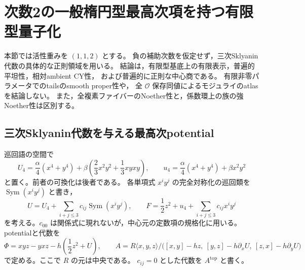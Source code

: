 \section{次数2の一般楕円型最高次項を持つ有限型量子化}
\label{sec:elliptic-degree-two-finite}

本節では活性重みを $(1,1,2)$ とする。
負の補助次数を仮定せず，三次Sklyanin代数の具体的な正則領域を用いる。
結論は，有限型基底上の有限表示，普遍的平坦性，相対ambient CY性，
および普遍的に正則な中心商である。
有限非零パラメータでのtailsのsmooth proper性や，
全 $\mathcal O$ 保存同値によるモジュライのatlasを結論しない。
また，全複素ファイバーのNoether性と，係数環上の族の強Noether性は区別する。

\subsection{三次Sklyanin代数を与える最高次potential}

巡回語の空間で
\[
 U_4=\frac{\alpha}{4}(x^4+y^4)
       +\beta\left(\frac23x^2y^2+\frac13xyxy\right),\qquad
 u_4=\frac{\alpha}{4}(x^4+y^4)+\beta x^2y^2
\]
と置く。前者の可換化は後者である。
各単項式 $x^iy^j$ の完全対称化の巡回類を $\operatorname{Sym}(x^iy^j)$ と書き，
\[
 U=U_4+\sum_{i+j\le3}c_{ij}\operatorname{Sym}(x^iy^j),\qquad
 F=\frac12z^2+u_4+\sum_{i+j\le3}c_{ij}x^iy^j
\]
を考える。$c_{00}$ は関係式に現れないが，中心元の定数項の規格化に用いる。
potentialと代数を
\begin{equation}\label{eq:elliptic-potential}
 \Phi=xyz-yxz-h\left(\frac12z^2+U\right),\qquad
 A=R\langle x,y,z\rangle/
  \bigl([x,y]-hz,\ [y,z]-h\partial_xU,\ [z,x]-h\partial_yU\bigr)
\end{equation}
で定める。ここで $R$ の元は中央である。
$c_{ij}=0$ とした代数を $A^{\mathrm{top}}$ と書く。

